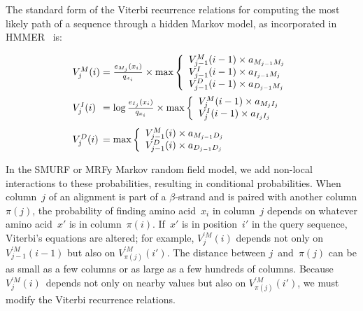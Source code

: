 \documentclass{acm_proc_article-sp}
\begin{document}
The standard form of the Viterbi
recurrence relations for computing the most likely path of a sequence through
a hidden Markov model, as incorporated in HMMER~\cite{Eddy:1998ut} is:

\newcommand\txprobj[3][]{a#1_{{#2}_{j-1}{#3}_j}}
\newcommand\txprobjj[3][]{a#1_{{#2}_{j-1}{#3}_j}}
\newcommand\alignwidth{\ensuremath C} %
\newcommand\pairedwith[1]{{\pi(#1)}}

\newcommand\vsum[2]{#2&{}+{}& #1}

\def\goo{18pt}
\def\gum{14pt}

\def\maxiquad{\hskip 1.2em\relax}
\begin{equation}
\begin{array}{@{}l@{}c@{}l}

V_{j}^{M}(i) &{}={}& \frac{e_{M_{j}}(x_{i})}{q_{x_{i}}} \times \max \left\{
  \begin{array}{l@{}c@{}l}
  V_{j-1}^{M}(i - 1) \times a_{M_{j-1}M_{j}}\\
  V_{j-1}^{I}(i - 1) \times a_{I_{j-1}M_{j}}\\
  V_{j-1}^{D}(i - 1) \times a_{D_{j-1}M_{j}}\\
  \end{array} \right.\\[\goo]
V_{j}^{I}(i) &=& \log\frac{e_{I_{j}}(x_{i})}{q_{x_{i}}} \times \max \left\{
  \begin{array}{l@{}c@{}l}
  V_{j}^{M}(i - 1) \times a_{M_{j}I_{j}}\\
  V_{j}^{I}(i - 1) \times a_{I_{j}I_{j}}\\
  \end{array} \right.\\[\gum]
V_{j}^{D}(i) &=& \max \left\{
  \begin{array}{l@{}c@{}l}
  V_{j-1}^{M}(i) \times a_{M_{j-1}D_{j}}\\
  V_{j-1}^{D}(i) \times a_{D_{j-1}D_{j}}\\
  \end{array} \right.\\

\end{array}
\end{equation}

In the SMURF or MRFy Markov random field model, we add non-local interactions 
to these
probabilities, resulting in conditional probabilities.
When column~$j$ of an alignment is part of a $\beta$-strand and is paired
with another column  $\pairedwith j$,
the probability of finding amino acid~$x_i$ in column~$j$ 
depends on whatever amino acid~$x'$  is in column~${\pairedwith i}$.
If~$x'$ is in position~$i'$ in the query sequence, Viterbi's
equations are altered; for example,
$V_{j}^{\prime M}(i)$ depends not only on
$V_{j-1}^{\prime M}(i-1)$ but also on
$V_{\pairedwith j}^{\prime M}(i')$.
The distance between $j$~and~$\pairedwith j$ can be as small as a few
columns or as large as a few hundreds of columns.
Because $V_j^{\prime M}(i)$~depends not only on nearby values but also on
$V_{\pairedwith j}^{\prime M}(i')$,
we must modify the Viterbi recurrence relations.
\end{document}
